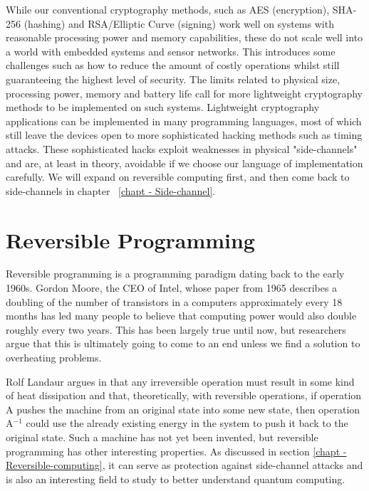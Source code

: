 
While our conventional cryptography methods, such as AES (encryption), SHA-256 (hashing) and RSA/Elliptic Curve (signing) work well on systems with reasonable processing power and memory capabilities, these do not scale well into a world with embedded systems and sensor networks.
This introduces some challenges such as how to reduce the amount of costly operations whilst still guaranteeing the highest level of security. The limits related to physical size, processing power, memory and battery life call for more lightweight cryptography methods to be implemented on such systems.
Lightweight cryptography applications can be implemented in many programming languages, most of which still leave the devices open to more sophisticated hacking methods such as timing attacks.
These sophisticated hacks exploit weaknesses in physical "side-channels" and are, at least in theory, avoidable if we choose our language of implementation carefully.
We will expand on reversible computing first, and then come back to side-channels in chapter ~\ref{chapt - Side-channel}.

\section{Reversible Programming}

Reversible programming is a programming paradigm dating back to the early 1960s. Gordon Moore, the CEO of Intel, whose paper from 1965 describes a doubling of the number of transistors in a computers approximately every 18 months has led many people to believe that computing power would also double roughly every two years. This has been largely true until now, but researchers argue that this is ultimately going to come to an end unless we find a solution to overheating problems.

Rolf Landaur argues in \cite{Irreversibility_paper}that any irreversible operation must result in some kind of heat dissipation and that, theoretically, with reversible operations, if operation A pushes the machine from an original state into some new state, then operation A$^{-1}$ could use the already existing energy in the system to push it back to the original state.
Such a machine has not yet been invented, but reversible programming has other interesting properties.
As discussed in section \ref{chapt - Reversible-computing}, it can serve as protection against side-channel attacks and is also an interesting field to study to better understand quantum computing.

